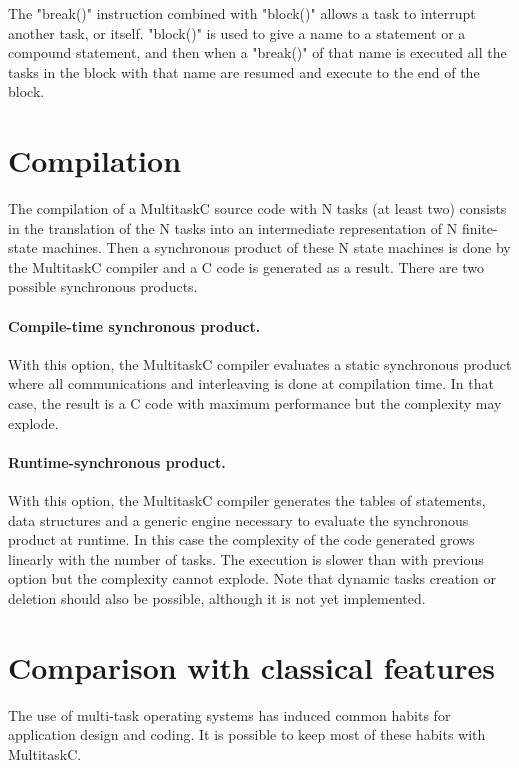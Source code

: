 \documentclass[10pt]{report}
\begin{document}
The "break()" instruction combined with "block()" allows a task to interrupt another task, or itself. "block()"
is used to give a name to a statement or a compound statement, and then when a "break()" of that name is executed 
all the tasks in the block with that name are resumed and execute to the end of the block.

\section{Compilation}

The compilation of a MultitaskC source code with N tasks (at least two) consists in the translation of the N tasks 
into an intermediate representation of N finite-state machines. Then a synchronous product of these N state machines 
is done by the MultitaskC compiler and a C code is generated as a result. There are two possible synchronous products.

\paragraph{Compile-time synchronous product.} With this option, the MultitaskC compiler evaluates a static
synchronous product where all communications and interleaving is done at compilation time. In that case, the result is 
a C code with maximum performance but the complexity may explode.

\paragraph{Runtime-synchronous product.} With this option, the MultitaskC compiler generates the tables of statements, 
data structures and a generic engine necessary to evaluate the synchronous product at runtime. In this case
the complexity of the code generated grows linearly with the number of tasks. The execution is slower than with
previous option but the complexity cannot explode. Note that dynamic tasks creation or deletion should also 
be possible, although it is not yet implemented.

\section{Comparison with classical features}

The use of multi-task operating systems has induced common habits for application design and coding. It is
possible to keep most of these habits with MultitaskC.
\end{document}
